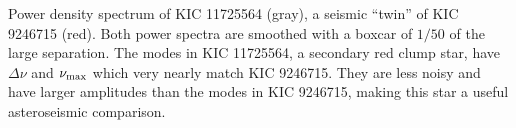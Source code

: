 \label{fig:twin}
Power density spectrum of KIC 11725564 (gray), a seismic ``twin'' of KIC 9246715 (red). Both power spectra are smoothed with a boxcar of $1/50$ of the large separation. The modes in KIC 11725564, a secondary red clump star, have $\Delta \nu$ and $\nu_{\rm{max}}$ which very nearly match KIC 9246715. They are less noisy and have larger amplitudes than the modes in KIC 9246715, making this star a useful asteroseismic comparison.